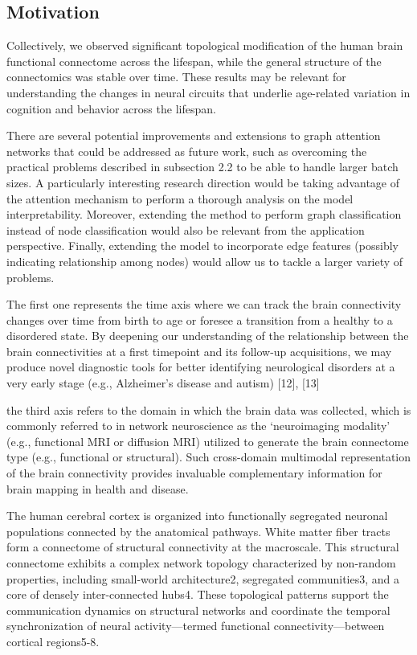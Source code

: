 
\subsection{Motivation}

Collectively, we observed significant topological modification of 
the human brain functional connectome
across the lifespan, while the general structure of the connectomics 
was stable over time.  
These results may be
relevant for understanding the changes in neural circuits
that underlie age-related variation in cognition and behavior across 
the lifespan. 
\cite{Cao2014}

There are several potential improvements and extensions to graph attention networks that could be
addressed as future work, such as overcoming the practical problems described in subsection 2.2 to
be able to handle larger batch sizes. A particularly interesting research direction would be taking
advantage of the attention mechanism to perform a thorough analysis on the model interpretability.
Moreover, extending the method to perform graph classification instead of node classification would
also be relevant from the application perspective. Finally, extending the model to incorporate edge
features (possibly indicating relationship among nodes) would allow us to tackle a larger variety of
problems.



\cite{Velickovic2018}

The first one represents the time axis where we can
track the brain connectivity changes over time from birth to
age or foresee a transition from a healthy to a disordered
state.
By deepening our understanding of the relationship
between the brain connectivities at a first timepoint and its
follow-up acquisitions, we may produce novel diagnostic
tools for better identifying neurological disorders at a very
early stage (e.g., Alzheimer’s disease and autism) [12], [13]

the third axis refers to the domain in
which the brain data was collected, which is commonly
referred to in network neuroscience as the ‘neuroimaging
modality’ (e.g., functional MRI or diffusion MRI) utilized
to generate the brain connectome type (e.g., functional or
structural). Such cross-domain multimodal representation of
the brain connectivity provides invaluable complementary
information for brain mapping in health and disease.
\cite{Bessadok2022}

The human cerebral cortex is organized into functionally segregated 
neuronal populations connected by the anatomical pathways. 
White matter fiber tracts form a connectome of structural 
connectivity at the macroscale. This structural connectome exhibits 
a complex network topology characterized by non-random properties, 
including small-world architecture2, segregated 
communities3, and a core of densely inter-connected hubs4. 
These topological patterns support the communication dynamics on 
structural networks and coordinate the temporal synchronization of 
neural activity—termed functional connectivity—between cortical regions5-8.

